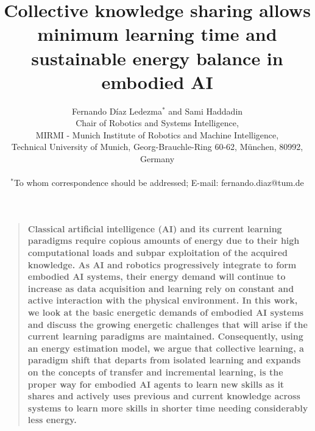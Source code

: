 \documentclass[12pt]{article}
\title{Collective knowledge sharing allows minimum learning time and sustainable energy balance in embodied AI}
\author
{Fernando D\'iaz Ledezma$^{\ast}$ and Sami Haddadin
\\
\normalsize{Chair of Robotics and Systems Intelligence,}\\
\normalsize{MIRMI - Munich Institute of Robotics and Machine Intelligence,}\\
\normalsize{Technical University of Munich, Georg-Brauchle-Ring 60-62, M\"unchen, 80992, Germany}\\
\\
\normalsize{$^\ast$To whom correspondence should be addressed; E-mail: fernando.diaz@tum.de}
}
\date{}
\newenvironment{sciabstract}{%
\begin{quote} \bf}
{\end{quote}}
\begin{document}
 

\baselineskip24pt


\maketitle 



\begin{sciabstract}
	Classical artificial intelligence (AI) and its current learning paradigms require copious amounts of energy due to their high computational loads and subpar exploitation of the acquired knowledge. As AI and robotics progressively integrate to form embodied AI systems, their energy demand will continue to increase as data acquisition and learning rely on constant and active interaction with the physical environment. In this work, we look at the basic energetic demands of embodied AI systems and discuss the growing energetic challenges that will arise if the current learning paradigms are maintained. Consequently, using an energy estimation model, we argue that collective learning, a paradigm shift that departs from isolated learning and expands on the concepts of transfer and incremental learning, is the proper way for embodied AI agents to learn new skills as it shares and actively uses previous and current knowledge across systems to learn more skills in shorter time needing considerably less energy.
\end{sciabstract}

\end{document}
